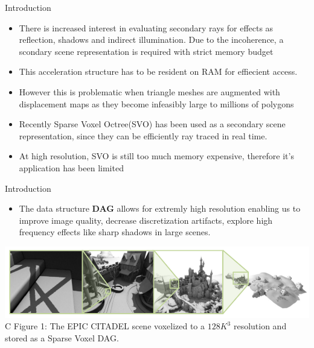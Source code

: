 \documentclass{beamer}
\begin{document}
\begin{frame}{Introduction}
  \begin{itemize}
  \item {
    There is increased interest in evaluating secondary rays for effects as reflection, shadows and indirect illumination. Due to the incoherence, a scondary scene representation is required with strict memory budget
    
  }
  \item {   
    This acceleration structure has to be resident on RAM for effiecient access.
  }
  \item{
  However this is problematic when triangle meshes are augmented with displacement maps as they become infeasibly large to millions of polygons
  }
  \item {
  	Recently Sparse Voxel Octree(SVO) has been used as a secondary scene representation, since they can be efficiently ray traced in real time.
  }
  \item {
  	At high resolution, SVO is still too much memory expensive, therefore it's application has been limited }
  \end{itemize}
\end{frame}

\begin{frame}{Introduction}
  \begin{itemize}
  \item {
  		The data structure \textbf{DAG} allows for extremly high resolution enabling us to improve image quality, decrease discretization artifacts, explore high frequency effects like sharp shadows in large scenes.
    }
 
  \end{itemize}
  \includegraphics[scale=0.36]{fig1}{C Figure 1: The EPIC CITADEL scene voxelized to a $128K^3$ resolution and stored as a Sparse Voxel DAG.}
\end{frame}
\end{document}
